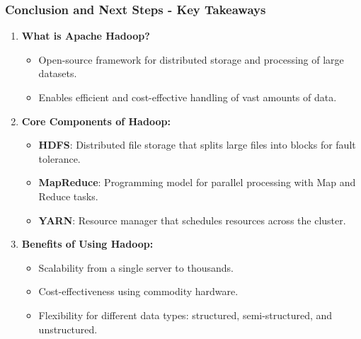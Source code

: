 \documentclass{beamer}
\begin{document}
\begin{frame}[fragile]
    \frametitle{Conclusion and Next Steps - Key Takeaways}
    \begin{enumerate}
        \item \textbf{What is Apache Hadoop?}
        \begin{itemize}
            \item Open-source framework for distributed storage and processing of large datasets.
            \item Enables efficient and cost-effective handling of vast amounts of data.
        \end{itemize}
        
        \item \textbf{Core Components of Hadoop:}
        \begin{itemize}
            \item \textbf{HDFS}: Distributed file storage that splits large files into blocks for fault tolerance.
            \item \textbf{MapReduce}: Programming model for parallel processing with Map and Reduce tasks.
            \item \textbf{YARN}: Resource manager that schedules resources across the cluster.
        \end{itemize}
        
        \item \textbf{Benefits of Using Hadoop:}
        \begin{itemize}
            \item Scalability from a single server to thousands.
            \item Cost-effectiveness using commodity hardware.
            \item Flexibility for different data types: structured, semi-structured, and unstructured.
        \end{itemize}
    \end{enumerate}
\end{frame}
\end{document}
